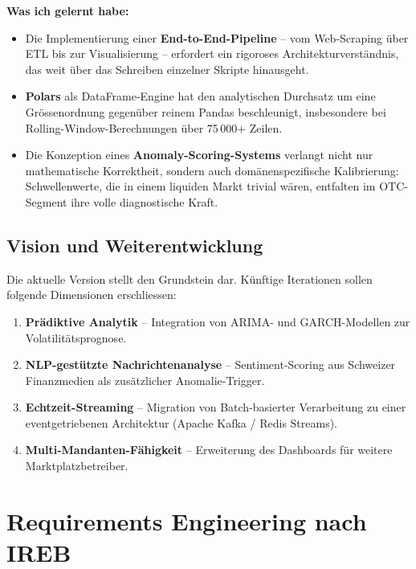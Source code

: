 \documentclass[12pt, a4paper, oneside]{report}
\begin{document}
\textbf{Was ich gelernt habe:}
\begin{itemize}
  \item Die Implementierung einer \textbf{End-to-End-Pipeline} -- vom Web-Scraping über ETL bis zur Visualisierung -- erfordert ein rigoroses Architekturverständnis, das weit über das Schreiben einzelner Skripte hinausgeht.
  \item \textbf{Polars} als DataFrame-Engine hat den analytischen Durchsatz um eine Grössenordnung gegenüber reinem Pandas beschleunigt, insbesondere bei Rolling-Window-Berechnungen über 75\,000+ Zeilen.
  \item Die Konzeption eines \textbf{Anomaly-Scoring-Systems} verlangt nicht nur mathematische Korrektheit, sondern auch domänenspezifische Kalibrierung: Schwellenwerte, die in einem liquiden Markt trivial wären, entfalten im OTC-Segment ihre volle diagnostische Kraft.
\end{itemize}

\section{Vision und Weiterentwicklung}

Die aktuelle Version stellt den Grundstein dar. Künftige Iterationen sollen folgende Dimensionen erschliessen:

\begin{enumerate}
  \item \textbf{Prädiktive Analytik} -- Integration von ARIMA- und GARCH-Modellen zur Volatilitätsprognose.
  \item \textbf{NLP-gestützte Nachrichtenanalyse} -- Sentiment-Scoring aus Schweizer Finanzmedien als zusätzlicher Anomalie-Trigger.
  \item \textbf{Echtzeit-Streaming} -- Migration von Batch-basierter Verarbeitung zu einer eventgetriebenen Architektur (Apache Kafka / Redis Streams).
  \item \textbf{Multi-Mandanten-Fähigkeit} -- Erweiterung des Dashboards für weitere Marktplatzbetreiber.
\end{enumerate}

\chapter{Requirements Engineering nach IREB}
\end{document}
